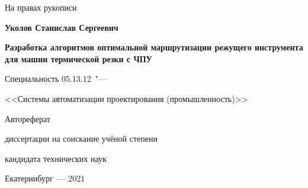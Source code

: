 \thispagestyle{empty}

\begin{flushright}
  \large{На правах рукописи}
\end{flushright}

\vspace{0pt plus1fill} %
\begin{center}
\textbf {\large
Уколов Станислав Сергеевич
}
\end{center}

\vspace{0pt plus3fill} %
\begin{center}
\textbf {\Large %
Разработка алгоритмов оптимальной маршрутизации
режущего инструмента
для машин термической резки с ЧПУ
}

\vspace{0pt plus3fill} %
{\large Специальность 05.13.12\ "---\par <<Системы автоматизации проектирования (промышленность)>>}

\vspace{0pt plus1.5fill} %
\Large{Автореферат}\par
\large{диссертации на соискание учёной степени\par кандидата технических наук}
\end{center}

\vspace{0pt plus4fill} %
{\centering
Екатеринбург~--- 2021
\par}

\clearpage
